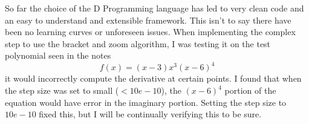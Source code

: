 \documentclass[12pt,parskip=full]{article}
\numberwithin{subsection}{section}
\begin{document}
		So far the choice of the D Programming language has led to very clean code and an easy to understand and extensible framework. 
		This isn't to say there have been no learning curves or unforeseen issues. When implementing the complex step to use the bracket and zoom algorithm,
		I was testing it on the test polynomial seen in the notes
		\begin{equation}
			f(x) = (x - 3)x^3(x-6)^4
		\end{equation}
		it would incorrectly compute the derivative at certain points. I found that when the step size was set to small ($< 10e-10$), the $(x-6)^4$ portion 
		of the equation would have error in the imaginary portion. Setting the step size to $10e-10$ fixed this, but I will be continually verifying this
		to be sure.
\end{document}
